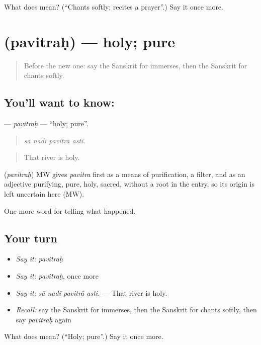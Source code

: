 \begin{tcolorbox}[breakable,colback=teal!4,colframe=teal!35!black,title={Before you move on}]
What does  mean? (\textquotedblleft{}Chants softly; recites a prayer\textquotedblright{}.) Say it once more.
\end{tcolorbox}
\section[\texorpdfstring{\sk{पवित्रः} (pavitraḥ)}{पवित्रः (pavitraḥ)}]{ (pavitraḥ) — holy; pure}

\label{lesson:SA-C331-pavitrah}



\begin{quote}
Before the new one: say the Sanskrit for immerses, then the Sanskrit for chants softly.
\end{quote}

\subsection*{You'll want to know: }
\textbf{} — \emph{pavitraḥ} — \textquotedblleft{}holy; pure\textquotedblright{}.

\begin{quote}
   
\end{quote}

\begin{quote}
\emph{sā nadī pavitrā asti.}
\end{quote}

\begin{quote}
That river is holy.
\end{quote}

\begin{cousinweb}
\textbf{} (\emph{pavitraḥ}) MW gives \emph{pavitra} first as a means of purification, a filter, and as an adjective purifying, pure, holy, sacred, without a root in the entry, so its origin is left uncertain here (MW).
\end{cousinweb}

\begin{grammarlens}[title={What you've built}]
One more word for telling what happened.
\end{grammarlens}

\subsection*{Your turn}
\begin{itemize}
\raggedright
  \item \emph{Say it:} \emph{pavitraḥ}
  \item \emph{Say it:} \emph{pavitraḥ}, once more
  \item \emph{Say it:} \emph{sā nadī pavitrā asti.} — That river is holy.
  \item \emph{Recall:} say the Sanskrit for immerses, then the Sanskrit for chants softly, then say \emph{pavitraḥ} again
\end{itemize}

\begin{tcolorbox}[breakable,colback=teal!4,colframe=teal!35!black,title={Before you move on}]
What does  mean? (\textquotedblleft{}Holy; pure\textquotedblright{}.) Say it once more.
\end{tcolorbox}
